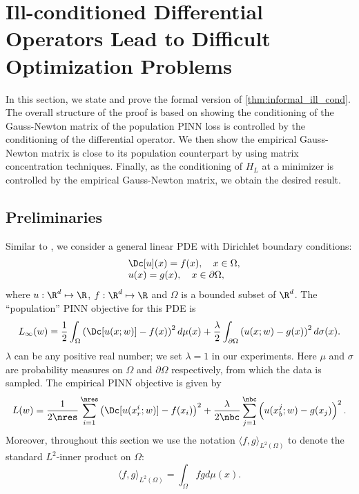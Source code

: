 \section{Ill-conditioned Differential Operators Lead to Difficult Optimization Problems}
In this section, we state and prove the formal version of \cref{thm:informal_ill_cond}.
The overall structure of the proof is based on showing the conditioning of the Gauss-Newton matrix of the population PINN loss is controlled by the conditioning of the differential operator.
We then show the empirical Gauss-Newton matrix is close to its population counterpart by using matrix concentration techniques. 
Finally, as the conditioning of $H_L$ at a minimizer is controlled by the empirical Gauss-Newton matrix, we obtain the desired result. 

\label{section:ill-cond-D}
\subsection{Preliminaries}
Similar to \citet{de2023operator}, we consider a general linear PDE with Dirichlet boundary conditions:
\[
\begin{array}{ll}
    & \Dc[u](x) = f(x),\quad x\in \Omega, \\
    & u(x) = g(x), \quad x\in \partial \Omega,
\end{array}
\]
where $u: \R^d \mapsto \R$, $f:\R^d \mapsto \R$ and $\Omega$ is a bounded subset of $\R^d$.
The ``population'' PINN objective for this PDE is
\[
L_\infty(w) = \frac{1}{2}\int_{\Omega}\left(\Dc[u(x;w)]-f(x)\right)^2d\mu(x)+\frac{\lambda}{2} \int_{\partial \Omega}\left(u(x; w)-g(x)\right)^2d\sigma(x).
\]
$\lambda$ can be any positive real number; we set $\lambda = 1$ in our experiments.
Here $\mu$ and $\sigma$ are probability measures on $\Omega$ and $\partial \Omega$ respectively, from which the data is sampled. 
The empirical PINN objective is given by
\[
L(w) = \frac{1}{2\nres}\sum_{i=1}^{\nres}\left(\Dc[u(x^i_r;w)]-f(x_i)\right)^2+\frac{\lambda}{2\nbc}\sum_{j=1}^{\nbc}\left(u(x_b^j;w)-g(x_j)\right)^2.
\]
Moreover, throughout this section we use the notation $\langle f,g\rangle_{L^{2}(\Omega)}$ to denote the standard $L^2$-inner product on $\Omega$:
\[
\langle f,g\rangle_{L^{2}(\Omega)} = \int_{\Omega}fg d\mu(x).
\]


